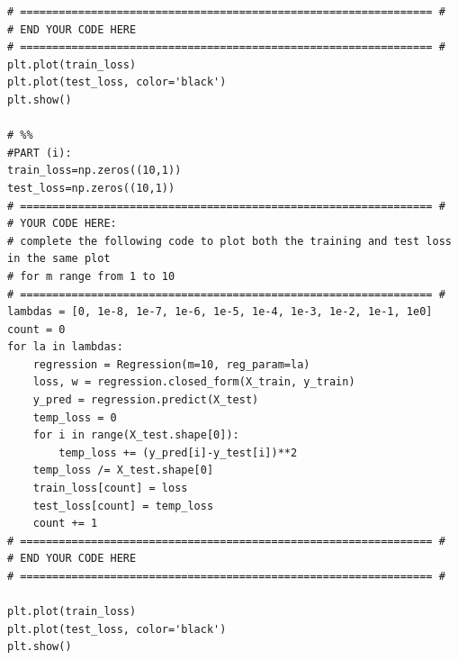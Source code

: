 \documentclass[letterpaper]{article}
\theoremstyle{definition}
\begin{document}
\begin{verbatim}
# ================================================================ #
# END YOUR CODE HERE
# ================================================================ #
plt.plot(train_loss)
plt.plot(test_loss, color='black')
plt.show()

# %%
#PART (i): 
train_loss=np.zeros((10,1))
test_loss=np.zeros((10,1))
# ================================================================ #
# YOUR CODE HERE:
# complete the following code to plot both the training and test loss in the same plot
# for m range from 1 to 10
# ================================================================ #
lambdas = [0, 1e-8, 1e-7, 1e-6, 1e-5, 1e-4, 1e-3, 1e-2, 1e-1, 1e0]
count = 0
for la in lambdas:
    regression = Regression(m=10, reg_param=la)
    loss, w = regression.closed_form(X_train, y_train)
    y_pred = regression.predict(X_test)
    temp_loss = 0
    for i in range(X_test.shape[0]):
        temp_loss += (y_pred[i]-y_test[i])**2
    temp_loss /= X_test.shape[0]
    train_loss[count] = loss
    test_loss[count] = temp_loss
    count += 1
# ================================================================ #
# END YOUR CODE HERE
# ================================================================ #

plt.plot(train_loss)
plt.plot(test_loss, color='black')
plt.show()



\end{verbatim}
\end{document}

